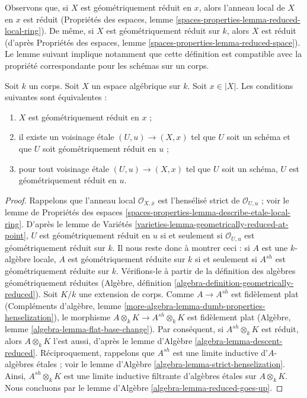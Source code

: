 \noindent
Observons que, si $X$ est géométriquement réduit en $x$, alors l'anneau local
de $X$ en $x$ est réduit (Propriétés des espaces, lemme
\ref{spaces-properties-lemma-reduced-local-ring}).
De même, si $X$ est géométriquement réduit sur $k$, alors $X$ est réduit
(d'après Propriétés des espaces, lemme \ref{spaces-properties-lemma-reduced-space}).
Le lemme suivant implique notamment que cette définition est compatible
avec la propriété correspondante pour les schémas sur un corps.

\begin{lemma}
\label{lemma-geometrically-reduced-at-point}
Soit $k$ un corps. Soit $X$ un espace algébrique sur $k$.
Soit $x \in |X|$. Les conditions suivantes sont équivalentes :
\begin{enumerate}
\item $X$ est géométriquement réduit en $x$ ;
\item il existe un voisinage \'etale $(U, u) \to (X, x)$
tel que $U$ soit un schéma et que $U$ soit géométriquement réduit en $u$ ;
\item pour tout voisinage \'etale $(U, u) \to (X, x)$
tel que $U$ soit un schéma, $U$ est géométriquement réduit en $u$.
\end{enumerate}
\end{lemma}

\begin{proof}
Rappelons que l'anneau local $\mathcal{O}_{X, \overline{x}}$
est l'hensélisé strict de $\mathcal{O}_{U, u}$ ; voir le
lemme de Propriétés des espaces
\ref{spaces-properties-lemma-describe-etale-local-ring}.
D'après le lemme de Variétés \ref{varieties-lemma-geometrically-reduced-at-point},
$U$ est géométriquement réduit en $u$ si et seulement
si $\mathcal{O}_{U, u}$ est géométriquement réduit sur $k$.
Il nous reste donc à montrer ceci : si $A$ est une $k$-algèbre locale,
$A$ est géométriquement réduite sur $k$ si et seulement si
$A^{sh}$ est géométriquement réduite sur $k$.
Vérifions-le à partir de la définition des algèbres
géométriquement réduites (Algèbre, définition \ref{algebra-definition-geometrically-reduced}).
Soit $K/k$ une extension de corps.
Comme $A \to A^{sh}$ est fidèlement plat
(Compléments d'algèbre, lemme \ref{more-algebra-lemma-dumb-properties-henselization}),
le morphisme
$A \otimes_k K \to A^{sh} \otimes_k K$ est fidèlement plat
(Algèbre, lemme \ref{algebra-lemma-flat-base-change}).
Par conséquent, si $A^{sh} \otimes_k K$ est réduit, alors
$A \otimes_k K$ l'est aussi, d'après le lemme d'Algèbre \ref{algebra-lemma-descent-reduced}.
Réciproquement, rappelons que $A^{sh}$ est une limite inductive
d'$A$-algèbres \'etales ; voir le
lemme d'Algèbre \ref{algebra-lemma-strict-henselization}.
Ainsi, $A^{sh} \otimes_k K$ est une limite inductive
filtrante d'algèbres \'etales sur $A \otimes_k K$.
Nous concluons par le lemme d'Algèbre \ref{algebra-lemma-reduced-goes-up}.
\end{proof}

